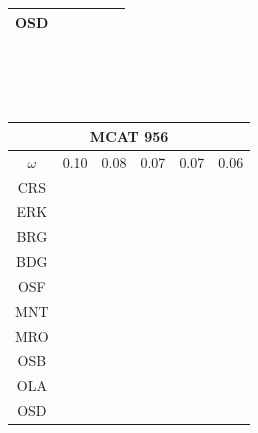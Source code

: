 \documentclass[12pt]{article}
\begin{document}
\begin{landscape}
\begin{figure}
{\begin{minipage}[c]{0.3\textwidth}
\begin{tabular}{|c|c|c|c|c|c|}
        OSD&\cellcolor[HTML]{FFFF33}&\cellcolor[HTML]{FF7F00}&\cellcolor[HTML]{FF7F00}&\cellcolor[HTML]{FF7F00}&\cellcolor[HTML]{984EA3}\\ \hline %
\end{tabular}\\$~$\\$~$\\
\hspace*{-2.5cm}
\begin{tabular}{|c|c|c|c|c|c|}%
         \hline \multicolumn{6}{|c|}{MCAT 956} \\ \hline
         $\omega$&0.10&0.08&0.07&0.07&0.06\\ \hline %
        CRS&\cellcolor[HTML]{E41A1C}&\cellcolor[HTML]{E41A1C}&\cellcolor[HTML]{E41A1C}&\cellcolor[HTML]{E41A1C}&\cellcolor[HTML]{E41A1C}\\ \hline %
        ERK&\cellcolor[HTML]{377EB8}&\cellcolor[HTML]{E41A1C}&\cellcolor[HTML]{E41A1C}&\cellcolor[HTML]{E41A1C}&\cellcolor[HTML]{E41A1C}\\ \hline %
        BRG&\cellcolor[HTML]{4DAF4A}&\cellcolor[HTML]{377EB8}&\cellcolor[HTML]{377EB8}&\cellcolor[HTML]{377EB8}&\cellcolor[HTML]{377EB8}\\ \hline %
        BDG&\cellcolor[HTML]{4DAF4A}&\cellcolor[HTML]{377EB8}&\cellcolor[HTML]{377EB8}&\cellcolor[HTML]{377EB8}&\cellcolor[HTML]{377EB8}\\ \hline %
        OSF&\cellcolor[HTML]{4DAF4A}&\cellcolor[HTML]{377EB8}&\cellcolor[HTML]{4DAF4A}&\cellcolor[HTML]{377EB8}&\cellcolor[HTML]{4DAF4A}\\ \hline %
        MNT&\cellcolor[HTML]{984EA3}&\cellcolor[HTML]{4DAF4A}&\cellcolor[HTML]{4DAF4A}&\cellcolor[HTML]{4DAF4A}&\cellcolor[HTML]{4DAF4A}\\ \hline %
        MRO&\cellcolor[HTML]{984EA3}&\cellcolor[HTML]{4DAF4A}&\cellcolor[HTML]{4DAF4A}&\cellcolor[HTML]{4DAF4A}&\cellcolor[HTML]{4DAF4A}\\ \hline %
        OSB&\cellcolor[HTML]{984EA3}&\cellcolor[HTML]{984EA3}&\cellcolor[HTML]{984EA3}&\cellcolor[HTML]{4DAF4A}&\cellcolor[HTML]{984EA3}\\ \hline %
        OLA&\cellcolor[HTML]{FF7F00}&\cellcolor[HTML]{984EA3}&\cellcolor[HTML]{984EA3}&\cellcolor[HTML]{984EA3}&\cellcolor[HTML]{984EA3}\\ \hline %
        OSD&\cellcolor[HTML]{FF7F00}&\cellcolor[HTML]{984EA3}&\cellcolor[HTML]{984EA3}&\cellcolor[HTML]{FF7F00}&\cellcolor[HTML]{FF7F00}\\ \hline %

\end{tabular}
\end{minipage}}
\end{figure}
\end{landscape}
\end{document}
